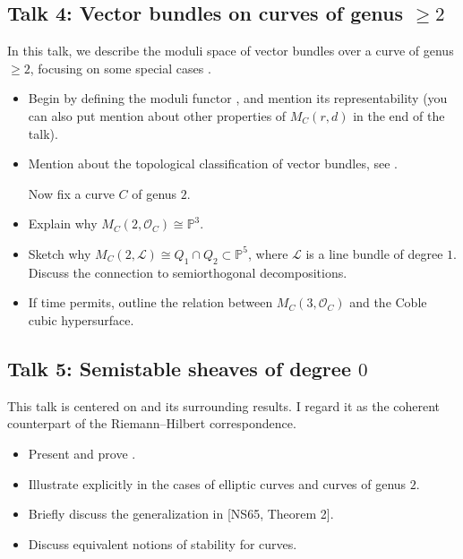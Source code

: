 \documentclass[UTF8]{amsart}
\numberwithin{equation}{section}
\theoremstyle{plain}
\numberwithin{equation}{section}
\theoremstyle{remark}
\begin{document}
\subsection*{Talk 4: Vector bundles on curves of genus $\geqslant 2$}\cite[2.3 \& 2.5]{MS19}
In this talk, we describe the moduli space of vector bundles over a curve of genus $\geqslant 2$, focusing on some special cases \cite[Examples 2.18–2.20]{MS19}.

\begin{itemize}
\item Begin by defining the moduli functor \cite[Definition 2.9]{MS19}, and mention its representability \cite[Theorem 2.10]{MS19} \cite[Theorem 1.3]{LLPZ24} (you can also put mention about other properties of $M_C(r,d)$ in the end of the talk).
\item Mention about the topological classification of vector bundles, see \cite[Theorem 3.4.1]{Potier97}.

\noindent \hspace{-8mm} Now fix a curve $C$ of genus $2$.
\item Explain why $M_C(2, \mathcal{O}_C) \cong \mathbb{P}^3$.
\item Sketch why $M_C(2, \mathcal{L}) \cong Q_1 \cap Q_2 \subset \mathbb{P}^5$, where $\mathcal{L}$ is a line bundle of degree $1$. Discuss the connection to semiorthogonal decompositions.
\item If time permits, outline the relation between $M_C(3, \mathcal{O}_C)$ and the Coble cubic hypersurface.
\end{itemize}

\subsection*{Talk 5: Semistable sheaves of degree $0$}\cite[2.4]{MS19}
This talk is centered on \cite[Theorem 2.14]{MS19} and its surrounding results. I regard it as the coherent counterpart of the Riemann--Hilbert correspondence.

\begin{itemize}
\item Present and prove \cite[Theorem 2.14]{MS19}.
\item Illustrate \cite[Theorem 2.14]{MS19} explicitly in the cases of elliptic curves and curves of genus $2$.
\item Briefly discuss the generalization in [NS65, Theorem 2].
\item  Discuss equivalent notions of stability for curves.
\end{itemize}
\end{document}
